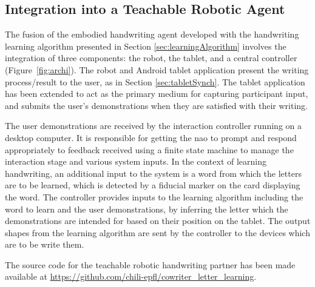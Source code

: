 \documentclass{sig-alternate}
\begin{document}
\subsection{Integration into a Teachable Robotic Agent}

The fusion of the embodied handwriting agent developed with the handwriting
learning algorithm presented in Section \ref{sec:learningAlgorithm} involves the
integration of three components: the robot, the tablet, and a central controller
(Figure~\ref{fig:archi}). The robot and Android tablet application present the
writing process/result to the user, as in Section \ref{sec:tabletSynch}.
The tablet application has been extended to act as the primary medium for
capturing participant input, and submits the user's demonstrations when they are
satisfied with their writing. 

The user demonstrations are received by the
interaction controller running on a desktop computer. It is responsible for
getting the {\sc nao} to prompt and respond appropriately to feedback received using
a finite state machine to manage the interaction stage and various system
inputs. In the context of learning handwriting, an additional input to the system 
is a word from which the letters are to be learned, which is detected by a fiducial 
marker on the card displaying the word.
The controller provides inputs to the learning algorithm including the word to learn
and the user demonstrations, by inferring the letter which the demonstrations are 
intended for based on their position on the tablet. The output shapes from the 
learning algorithm are sent by the controller to the devices which are to be write them.

The source code for the teachable robotic handwriting partner has been made 
available at \url{https://github.com/chili-epfl/cowriter_letter_learning}.


\end{document}
